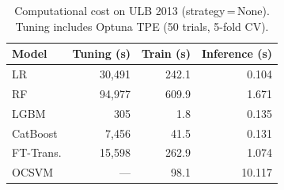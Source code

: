 \begin{table}[H]
\centering
\caption{Computational cost on ULB 2013 (strategy\,=\,None). Tuning includes Optuna TPE (50 trials, 5-fold CV).}
\label{tab:cost_ulb}
\begin{tabular}{l r r r}
\toprule
Model & Tuning (s) & Train (s) & Inference (s) \\
\midrule
LR         & 30,491 & 242.1 & 0.104 \\
RF         & 94,977 & 609.9 & 1.671 \\
LGBM       & 305 & 1.8 & 0.135 \\
CatBoost   & 7,456 & 41.5 & 0.131 \\
FT-Trans.  & 15,598 & 262.9 & 1.074 \\
OCSVM      & --- & 98.1 & 10.117 \\
\bottomrule
\end{tabular}
\end{table}